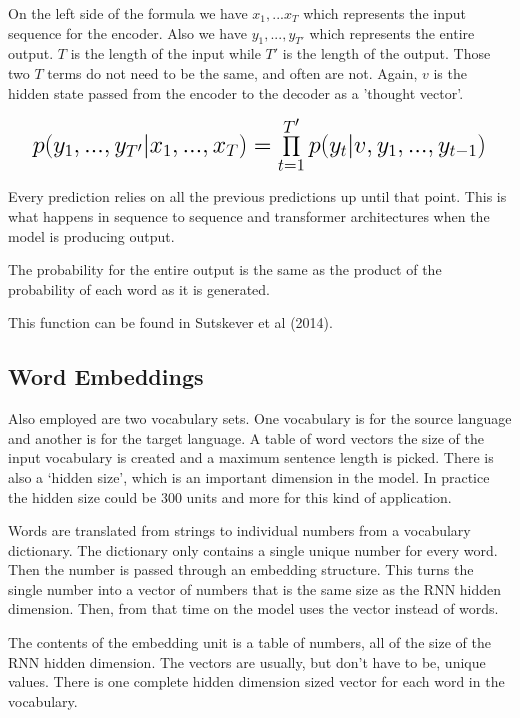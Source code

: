 On the left side of the formula we have $x_1,...x_T$ which represents the input sequence for the encoder. Also we have $y_1,...,y_{T'}$ which represents the entire output. $T$ is the length of the input while $T'$ is the length of the output. Those two $T$ terms do not need to be the same, and often are not. Again, $v$ is the hidden state passed from the encoder to the decoder as a 'thought vector'.

\[
\mathlarger{ \mathlarger{ \mathlarger{
			p(y_1,...,y_{T'}|x_1,...,x_T) = \prod_{t=1}^{T'} p(y_t|v,y_1,..., y_{t-1}) 
} } }
\]

Every prediction relies on all the previous predictions up until that point. This is what happens in sequence to sequence and transformer architectures when the model is producing output. 

The probability for the entire output is the same as the product of the probability of each word as it is generated.

This function can be found in Sutskever et al (2014)\cite{DBLP:journals/corr/SutskeverVL14}.



 


\subsection*{Word Embeddings}

Also employed are two vocabulary sets. One vocabulary is for the source language and another is for the target language. A table of word vectors the size of the input vocabulary is created and a maximum sentence length is picked. There is also a `hidden size', which is an important dimension in the model. In practice the hidden size could be 300 units and more for this kind of application.

Words are translated from strings to individual numbers from a vocabulary dictionary. The dictionary only contains a single unique number for every word. Then the number is passed through an embedding structure. This turns the single number into a vector of numbers that is the same size as the RNN hidden dimension. Then, from that time on the model uses the vector instead of words.

The contents of the embedding unit is a table of numbers, all of the size of the RNN hidden dimension. The vectors are usually, but don\textquoteright t have to be, unique values. There is one complete hidden dimension sized vector for each word in the vocabulary. 

